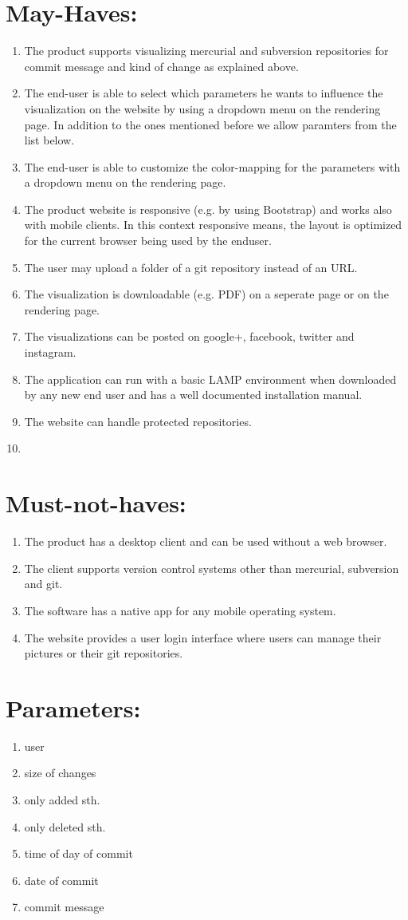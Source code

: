 \documentclass[10pt]{scrartcl}
\begin{document}
\section{May-Haves:}
\begin{enumerate}
\item The product supports visualizing mercurial and subversion repositories for commit message and kind of change as explained above.
\item The end-user is able to select which parameters he wants to influence the visualization on the website by using a dropdown menu on the rendering page. In addition to the ones mentioned before we allow paramters from the list below.
\item The end-user is able to customize the color-mapping for the parameters with  a dropdown menu on the rendering page.
\item The product website is responsive (e.g. by using Bootstrap) and works also with mobile clients. In this context responsive means, the layout is optimized for the current browser being used by the enduser.
\item The user may upload a folder of a git repository instead of an URL.
\item The visualization is downloadable (e.g. PDF) on a seperate page or on the rendering page.
\item The visualizations can be posted on google+, facebook, twitter and instagram.
\item The application can run with a basic LAMP environment when downloaded by any new end user and has a well documented installation manual.
\item The website can handle protected repositories.
\item 
\end{enumerate}
\section{Must-not-haves:}
\begin{enumerate}
\item The product has a desktop client and can be used without a web browser.
\item The client supports version control systems other than mercurial, subversion and git.
\item The software has a native app for any mobile operating system.
\item The website provides a user login interface where users can manage their pictures or their git repositories.
\end{enumerate}
\section{Parameters:}
\begin{enumerate}
\item user
\item size of changes
\item only added sth.
\item only deleted sth.
\item time of day of commit
\item date of commit
\item commit message
\end{enumerate}
\end{document}
